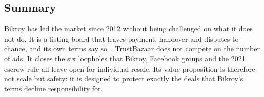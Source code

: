 \subsection{Summary}

Bikroy has led the market since 2012 without being challenged on what it does not do. It
is a listing board that leaves payment, handover and disputes to chance, and its own terms say
so~\cite{bikroy_terms}. TrustBazaar does not compete on the number of ads. It closes the six
loopholes that Bikroy, Facebook groups and the 2021 escrow rule all leave open for individual
resale. Its value proposition is therefore not scale but safety: it is designed to protect
exactly the deals that Bikroy's terms decline responsibility for.
